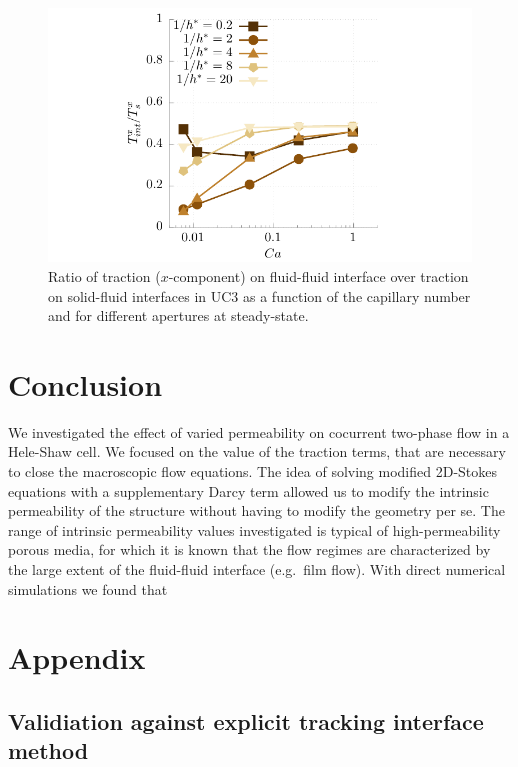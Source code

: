 \documentclass[]{article}
\begin{document}
\begin{figure}
\hypertarget{fig:ratioDragCa}{%
\centering
\includegraphics{figures/pdf/ratioDragCa.pdf}
\caption{Ratio of traction (\(x\)-component) on fluid-fluid interface
over traction on solid-fluid interfaces in UC3 as a function of the
capillary number and for different apertures at
steady-state.}\label{fig:ratioDragCa}
}
\end{figure}

\hypertarget{conclusion}{%
\section{Conclusion}\label{conclusion}}

We investigated the effect of varied permeability on cocurrent two-phase
flow in a Hele-Shaw cell. We focused on the value of the traction terms,
that are necessary to close the macroscopic flow equations. The idea of
solving modified 2D-Stokes equations with a supplementary Darcy term
allowed us to modify the intrinsic permeability of the structure without
having to modify the geometry per se. The range of intrinsic
permeability values investigated is typical of high-permeability porous
media, for which it is known that the flow regimes are characterized by
the large extent of the fluid-fluid interface (e.g.~film flow). With
direct numerical simulations we found that

\hypertarget{appendix}{%
\section{Appendix}\label{appendix}}

\hypertarget{validiation-against-explicit-tracking-interface-method}{%
\subsection{Validiation against explicit tracking interface
method}\label{validiation-against-explicit-tracking-interface-method}}
\end{document}
